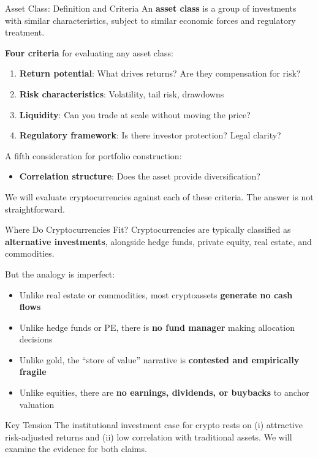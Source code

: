 \documentclass[10pt]{beamer}
\newcommand{\highlight}[1]{\textcolor{AccentOrange}{\textbf{#1}}}
\begin{document}
\begin{frame}{Asset Class: Definition and Criteria}
  An \highlight{asset class} is a group of investments with similar characteristics, subject to similar economic forces and regulatory treatment.
  
  \vspace{1em}
  \textbf{Four criteria} for evaluating any asset class:
  \begin{enumerate}
    \item \textbf{Return potential}: What drives returns? Are they compensation for risk?
    \item \textbf{Risk characteristics}: Volatility, tail risk, drawdowns
    \item \textbf{Liquidity}: Can you trade at scale without moving the price?
    \item \textbf{Regulatory framework}: Is there investor protection? Legal clarity?
  \end{enumerate}
  
  \vspace{1em}
  A fifth consideration for portfolio construction:
  \begin{itemize}
    \item \textbf{Correlation structure}: Does the asset provide diversification?
  \end{itemize}
  
  \vspace{0.5em}
  We will evaluate cryptocurrencies against each of these criteria. The answer is not straightforward.
\end{frame}

\begin{frame}{Where Do Cryptocurrencies Fit?}
  Cryptocurrencies are typically classified as \highlight{alternative investments}, alongside hedge funds, private equity, real estate, and commodities.
  
  \vspace{1em}
  But the analogy is imperfect:
  \begin{itemize}
    \item Unlike real estate or commodities, most cryptoassets \textbf{generate no cash flows}
    \item Unlike hedge funds or PE, there is \textbf{no fund manager} making allocation decisions
    \item Unlike gold, the ``store of value'' narrative is \textbf{contested and empirically fragile}
    \item Unlike equities, there are \textbf{no earnings, dividends, or buybacks} to anchor valuation
  \end{itemize}
  
  \vspace{1em}
  \begin{block}{Key Tension}
    The institutional investment case for crypto rests on (i) attractive risk-adjusted returns and (ii) low correlation with traditional assets. We will examine the evidence for both claims.
  \end{block}
\end{frame}
\end{document}
